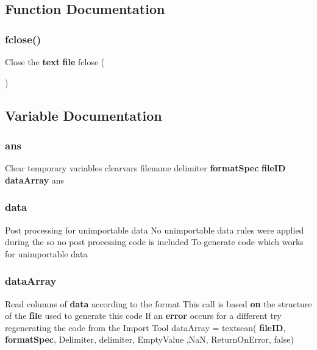 \subsection{Function Documentation}
\mbox{\label{_import_log_8m_a9a3043eed208fc59883c3d1fcdee2df9}} 
\subsubsection{fclose()}
{\footnotesize\ttfamily Close the \textbf{ text} \textbf{ file} fclose (\begin{DoxyParamCaption}\item[{\textbf{ file\+ID}}]{ }\end{DoxyParamCaption})}



\subsection{Variable Documentation}
\mbox{\label{_import_log_8m_a7f7889b4a2037f5c32b7a430f039ff3c}} 
\subsubsection{ans}
{\footnotesize\ttfamily Clear temporary variables clearvars filename delimiter \textbf{ format\+Spec} \textbf{ file\+ID} \textbf{ data\+Array} ans}

\mbox{\label{_import_log_8m_a32d7eebae6f15ceb9cc7f573d7dbd27d}} 
\subsubsection{data}
{\footnotesize\ttfamily Post processing for unimportable data No unimportable data rules were applied during the so no post processing code is included To generate code which works for unimportable data}

\mbox{\label{_import_log_8m_a7ae75349ad73aa5ca5625226265cbe36}} 
\subsubsection{data\+Array}
{\footnotesize\ttfamily Read columns of \textbf{ data} according to the format This call is based \textbf{ on} the structure of the \textbf{ file} used to generate this code If an \textbf{ error} occurs for a different try regenerating the code from the Import Tool data\+Array = textscan(\textbf{ file\+ID}, \textbf{ format\+Spec}, \textquotesingle{}Delimiter\textquotesingle{}, delimiter, \textquotesingle{}Empty\+Value\textquotesingle{} ,NaN, \textquotesingle{}Return\+On\+Error\textquotesingle{}, false)}

